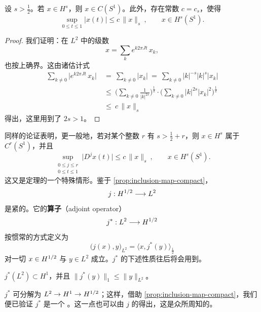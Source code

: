 \begin{proposition}\label{prop:sobolev-sup-norm-estimate}
设 $s>\frac{1}{2}$。若 $x\in H^{s}$，则 $x\in C(S^{1})$。此外，存在常数%
$c=c_{s}$，使得
\[
\sup_{0\leq t\leq1}\bigl|x(t)\bigr|\leq c\,\|x\|_{s}\ ,\qquad%
x\in H^{s}(S^{1}).
\]
\end{proposition}

\begin{proof}
我们证明：在 $L^{2}$ 中\trConverge{}的\trFourier{}级数
\[
x=\sum_{k}e^{k2\pi Jt}\,x_{k},
\]
也按上确界\trNorm{}\trConverge。这由诸估计式
\begin{align*}
\sum_{k\neq0}\bigl|e^{k2\pi Jt}\,x_{k}\bigr|\ &=\ \sum_{k\neq0}|x_{k}|\ =\ %
\sum_{k\neq0}|k|^{-s}|k|^{s}|x_{k}|\\
&\leq\ \Biggl(\sum_{k\neq0}\frac{1}{|k|^{2s}}\Biggr)^{\frac{1}{2}}\cdot%
\Biggl(\sum_{k\neq0}|k|^{2s}|x_{k}|^{2}\Biggr)^{\frac{1}{2}}\\
&\leq\ c\,\|x\|_{s}
\end{align*}
得出，这里用到了 $2s>1$。
\end{proof}

同样的论证表明，更一般地，若对某个整数 $r$ 有 $s>\frac{1}{2}+r$，则%
$x\in H^{s}$ 属于 $C^{r}(S^{1})$，并且
\[
\sup_{\substack{0\leq j\leq r\\ 0\leq t\leq1}}\bigl|D^{j}x(t)\bigr|\leq%
c\,\|x\|_{s}\ ,\qquad x\in H^{s}(S^{1}).
\]
这又是\trSobolev\trEmbedding{}定理的一个特殊情形。鉴于%
\cref{prop:inclusion-map-compact}，\trInclusionMapping
\begin{equation}\label{eq:inclusion-j}
j:H^{1/2}\longrightarrow L^{2}
\end{equation}
是紧的。它的\textbf{\trAdjoint{}算子}（adjoint operator）
\begin{equation}\label{eq:adjoint-j-star}
j^{*}:L^{2}\longrightarrow H^{1/2}
\end{equation}
按惯常的方式定义为
\begin{equation}\label{eq:adjoint-definition}
\bigl(j(x),y\bigr)_{L^{2}}=\bigl\langle x,j^{*}(y)\bigr\rangle_{\frac{1}{2}}
\end{equation}
对一切 $x\in H^{1/2}$ 与 $y\in L^{2}$ 成立。$j^{*}$ 的下述性质往后将会用到。

\begin{proposition}\label{prop:adjoint-map-h1}
$j^{*}(L^{2})\subset H^{1}$，并且 $\bigl\|j^{*}(y)\bigr\|_{1}\leq\|y\|_{L^{2}}$。
\end{proposition}

\trMapping{} $j^{*}$ 可分解为 $L^{2}\to H^{1}\to H^{1/2}$；这样，借助%
\cref{prop:inclusion-map-compact}，我们便已验证 $j^{*}$ 是一个%
\trCompactOperator。这一点也可以由 $j$ 的\trCompactness{}得出，这是众所周知的。

